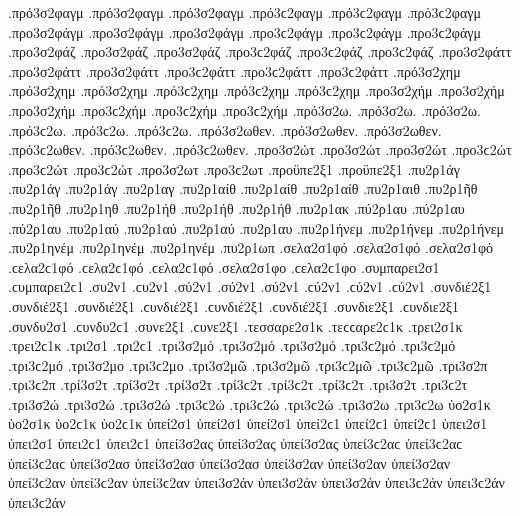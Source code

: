 {.πρό3σ2φαγμ .πρό3σ2φαγμ .πρό3σ2φαγμ .πρό3ϲ2φαγμ .πρό3ϲ2φαγμ .πρό3ϲ2φαγμ   %
.προ3σ2φάγμ .προ3σ2φάγμ .προ3σ2φάγμ .προ3ϲ2φάγμ .προ3ϲ2φάγμ .προ3ϲ2φάγμ 
.προ3σ2φάζ .προ3σ2φάζ .προ3σ2φάζ .προ3ϲ2φάζ .προ3ϲ2φάζ .προ3ϲ2φάζ   %
.προ3σ2φάττ .προ3σ2φάττ .προ3σ2φάττ .προ3ϲ2φάττ .προ3ϲ2φάττ .προ3ϲ2φάττ   %
.πρό3σ2χημ .πρό3σ2χημ .πρό3σ2χημ .πρό3ϲ2χημ .πρό3ϲ2χημ .πρό3ϲ2χημ   %
.προ3σ2χήμ .προ3σ2χήμ .προ3σ2χήμ .προ3ϲ2χήμ .προ3ϲ2χήμ .προ3ϲ2χήμ 
.πρό3σ2ω. .πρό3σ2ω. .πρό3σ2ω. .πρό3ϲ2ω. .πρό3ϲ2ω. .πρό3ϲ2ω. 
.πρό3σ2ωθεν. .πρό3σ2ωθεν. .πρό3σ2ωθεν. .πρό3ϲ2ωθεν. .πρό3ϲ2ωθεν. .πρό3ϲ2ωθεν. 
.προ3σ2ώτ .προ3σ2ώτ .προ3σ2ώτ .προ3ϲ2ώτ .προ3ϲ2ώτ .προ3ϲ2ώτ   %
.προ3σ2ωτ .προ3ϲ2ωτ 
.προϋπε2ξ1 .προϋπε2ξ1   %
.πυ2ρ1άγ .πυ2ρ1άγ .πυ2ρ1άγ   %
.πυ2ρ1αγ 
.πυ2ρ1αίθ .πυ2ρ1αίθ .πυ2ρ1αίθ   %
.πυ2ρ1αιθ   %
.πυ2ρ1ῆθ .πυ2ρ1ῆθ   %
.πυ2ρ1ηθ   %
.πυ2ρ1ήθ .πυ2ρ1ήθ .πυ2ρ1ήθ   %
.πυ2ρ1ακ   %
.πύ2ρ1αυ .πύ2ρ1αυ .πύ2ρ1αυ   %
.πυ2ρ1αύ .πυ2ρ1αύ .πυ2ρ1αύ 
.πυ2ρ1αυ   %
.πυ2ρ1ήνεμ .πυ2ρ1ήνεμ .πυ2ρ1ήνεμ   %
.πυ2ρ1ηνέμ .πυ2ρ1ηνέμ .πυ2ρ1ηνέμ 
.πυ2ρ1ωπ   %
.σελα2σ1φό .σελα2σ1φό .σελα2σ1φό .ϲελα2ϲ1φό .ϲελα2ϲ1φό .ϲελα2ϲ1φό   %
.σελα2σ1φο .ϲελα2ϲ1φο 
.συμπαρει2σ1 .ϲυμπαρει2ϲ1   %
.συ2ν1 .ϲυ2ν1 
.σύ2ν1 .σύ2ν1 .σύ2ν1 .ϲύ2ν1 .ϲύ2ν1 .ϲύ2ν1   %
.συνδιέ2ξ1 .συνδιέ2ξ1 .συνδιέ2ξ1 .ϲυνδιέ2ξ1 .ϲυνδιέ2ξ1 .ϲυνδιέ2ξ1   %
.συνδιε2ξ1 .ϲυνδιε2ξ1   %
.συνδυ2σ1 .ϲυνδυ2ϲ1   %
.συνε2ξ1 .ϲυνε2ξ1   %
.τεσσαρε2σ1κ .τεϲϲαρε2ϲ1κ   %
.τρει2σ1κ .τρει2ϲ1κ   %
.τρι2σ1 .τρι2ϲ1 
.τρι3σ2μό .τρι3σ2μό .τρι3σ2μό .τρι3ϲ2μό .τρι3ϲ2μό .τρι3ϲ2μό   %
.τρι3σ2μο .τρι3ϲ2μο 
.τρι3σ2μῶ .τρι3σ2μῶ .τρι3ϲ2μῶ .τρι3ϲ2μῶ 
.τρι3σ2π .τρι3ϲ2π   %
.τρί3σ2τ .τρί3σ2τ .τρί3σ2τ .τρί3ϲ2τ .τρί3ϲ2τ .τρί3ϲ2τ   %
.τρι3σ2τ .τρι3ϲ2τ 
.τρι3σ2ώ .τρι3σ2ώ .τρι3σ2ώ .τρι3ϲ2ώ .τρι3ϲ2ώ .τρι3ϲ2ώ   %
.τρι3σ2ω .τρι3ϲ2ω 
ὑο2σ1κ ὑο2σ1κ ὑο2ϲ1κ ὑο2ϲ1κ   %
ὑπεί2σ1 ὑπεί2σ1 ὑπεί2σ1 ὑπεί2ϲ1 ὑπεί2ϲ1 ὑπεί2ϲ1 
ὑπει2σ1 ὑπει2σ1 ὑπει2ϲ1 ὑπει2ϲ1 
ὑπεί3σ2ας ὑπεί3σ2ας ὑπεί3σ2ας ὑπεί3ϲ2αϲ ὑπεί3ϲ2αϲ ὑπεί3ϲ2αϲ   %
ὑπεί3σ2ασ ὑπεί3σ2ασ ὑπεί3σ2ασ 
ὑπεί3σ2αν ὑπεί3σ2αν ὑπεί3σ2αν ὑπεί3ϲ2αν ὑπεί3ϲ2αν ὑπεί3ϲ2αν 
ὑπει3σ2άν ὑπει3σ2άν ὑπει3σ2άν ὑπει3ϲ2άν ὑπει3ϲ2άν ὑπει3ϲ2άν 
}
